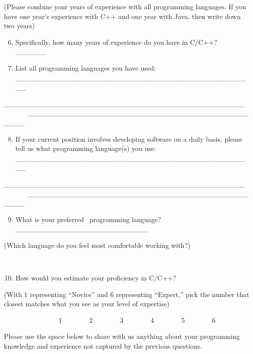 \documentclass[]{article}
\providecommand{\tightlist}{%
  \setlength{\itemsep}{0pt}\setlength{\parskip}{0pt}}
\begin{document}
{(Please combine your years of experience with all programming
languages. If you have one year's experience with C++ and one year with
Java, then write down two years)}

{}

\begin{enumerate}
\setcounter{enumi}{5}
\tightlist
\item
  {Specifically, how many years of experience do you have in C/C++?
  \_\_\_\_\_\_}
\end{enumerate}

{}

\begin{enumerate}
\setcounter{enumi}{6}
\tightlist
\item
  {List all programming languages you have used:\\
  \_\_\_\_\_\_\_\_\_\_\_\_\_\_\_\_\_\_\_\_\_\_\_\_\_\_\_\_\_\_\_\_\_\_\_\_\_\_\_\_\_\_\_\_\_\_\_}
\end{enumerate}

{\_\_\_\_\_\_\_\_\_\_\_\_\_\_\_\_\_\_\_\_\_\_\_\_\_\_\_\_\_\_\_\_\_\_\_\_\_\_\_\_\_\_\_\_\_\_\_~~~~~~~~\_\_\_\_\_\_\_\_\_\_\_\_\_\_\_\_\_\_\_\_\_\_\_\_\_\_\_\_\_\_\_\_\_\_\_\_\_\_\_\_\_\_\_\_\_\_\_~~~~~~~~
}

{}

\begin{enumerate}
\setcounter{enumi}{7}
\tightlist
\item
  {If your current position involves developing software on a daily
  basis, please tell us what programming language(s) you use:~~~~~~~~\\
  \_\_\_\_\_\_\_\_\_\_\_\_\_\_\_\_\_\_\_\_\_\_\_\_\_\_\_\_\_\_\_\_\_\_\_\_\_\_\_\_\_\_\_\_\_\_\_}
\end{enumerate}

{\_\_\_\_\_\_\_\_\_\_\_\_\_\_\_\_\_\_\_\_\_\_\_\_\_\_\_\_\_\_\_\_\_\_\_\_\_\_\_\_\_\_\_\_\_\_\_~~~~~~~~\_\_\_\_\_\_\_\_\_\_\_\_\_\_\_\_\_\_\_\_\_\_\_\_\_\_\_\_\_\_\_\_\_\_\_\_\_\_\_\_\_\_\_\_\_\_\_~~~~~~~~
}

\begin{enumerate}
\setcounter{enumi}{8}
\tightlist
\item
  {What is your preferred ~programming language?
  \_\_\_\_\_\_\_\_\_\_\_\_\_\_\_\_\_\_\_\_\_\_\_\_\_\_}
\end{enumerate}

{(Which language do you feel most comfortable working with?)}

{~~~~~~~~}

\begin{enumerate}
\setcounter{enumi}{9}
\tightlist
\item
  {How would you estimate your proficiency in C/C++?}
\end{enumerate}

{(With 1 representing ``Novice'' and 6 representing ``Expert,'' pick the
number that closest matches what you see as your level of expertise)}

{~~~~~~~~~~~~~~~~1~~~~~~~~2~~~~~~~~3~~~~~~~~4~~~~~~~~5~~~~~~~~6~~~~~~~~}

{Please use the space below to share with us anything about your
programming knowledge and experience not captured by the previous
questions.}
\end{document}
